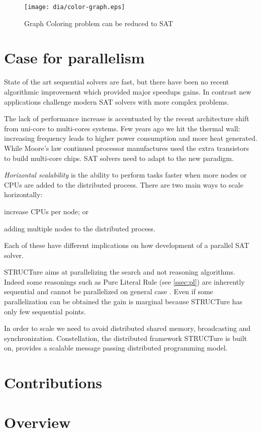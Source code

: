\begin{figure}
  \centering
  \texttt{[image: dia/color-graph.eps]}
  \caption{Graph Coloring problem can be reduced to SAT}
  \label{fig:color-graph}
\end{figure}


\section{Case for parallelism}

State of the art sequential solvers are fast, but there have been
no recent algorithmic improvement which provided major speedups
gains. In contrast new applications challenge modern SAT solvers
with more complex problems.

The lack of performance increase is accentuated by the recent
architecture shift from uni-core to multi-cores systems. Few
years ago we hit the thermal wall: increasing frequency leads to
higher power consumption and more heat generated. While Moore's law
continued processor manufactures used the extra transistors to build
multi-core chips.  SAT solvers need to adapt to the new paradigm.

\emph{Horizontal scalability} is the ability to perform tasks faster
when more nodes or CPUs are added to the distributed process. There
are two main ways to scale horizontally:
\begin{inparaenum}[a)]
  \item increase CPUs per node; or
  \item adding multiple nodes to the distributed process.
\end{inparaenum} Each of these have different implications
on how development of a parallel SAT solver.

STRUCTure aims at parallelizing the search and not reasoning
algorithms. Indeed some reasonings such as Pure Literal Rule (see
\ref{ssec:pl}) are inherently sequential and cannot be parallelized
on general case \cite{Johannsen:2005:CPL:1166822.1166834}. Even if
some parallelization can be obtained the gain is marginal because
STRUCTure has only few sequential points.

In order to scale we need to avoid distributed shared memory,
broadcasting and synchronization. Constellation, the distributed
framework STRUCTure is built on, provides a scalable message passing
distributed programming model.

\section{Contributions}

\section{Overview}
